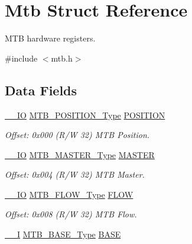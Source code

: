 \hypertarget{struct_mtb}{}\section{Mtb Struct Reference}
\label{struct_mtb}


M\+TB hardware registers.  




{\ttfamily \#include $<$mtb.\+h$>$}

\subsection*{Data Fields}
\begin{DoxyCompactItemize}
\item 
\mbox{\hyperlink{core__cm0plus_8h_aec43007d9998a0a0e01faede4133d6be}{\+\_\+\+\_\+\+IO}} \mbox{\hyperlink{union_m_t_b___p_o_s_i_t_i_o_n___type}{M\+T\+B\+\_\+\+P\+O\+S\+I\+T\+I\+O\+N\+\_\+\+Type}} \mbox{\hyperlink{struct_mtb_a7d1d53cd1d4146a97fb88e68e21de82f}{P\+O\+S\+I\+T\+I\+ON}}
\begin{DoxyCompactList}\small\item\em Offset\+: 0x000 (R/W 32) M\+TB Position. \end{DoxyCompactList}\item 
\mbox{\hyperlink{core__cm0plus_8h_aec43007d9998a0a0e01faede4133d6be}{\+\_\+\+\_\+\+IO}} \mbox{\hyperlink{union_m_t_b___m_a_s_t_e_r___type}{M\+T\+B\+\_\+\+M\+A\+S\+T\+E\+R\+\_\+\+Type}} \mbox{\hyperlink{struct_mtb_ae46de36e16f88cf202a77610219287f3}{M\+A\+S\+T\+ER}}
\begin{DoxyCompactList}\small\item\em Offset\+: 0x004 (R/W 32) M\+TB Master. \end{DoxyCompactList}\item 
\mbox{\hyperlink{core__cm0plus_8h_aec43007d9998a0a0e01faede4133d6be}{\+\_\+\+\_\+\+IO}} \mbox{\hyperlink{union_m_t_b___f_l_o_w___type}{M\+T\+B\+\_\+\+F\+L\+O\+W\+\_\+\+Type}} \mbox{\hyperlink{struct_mtb_a3321b65b1f61270bfa17be24d2770d69}{F\+L\+OW}}
\begin{DoxyCompactList}\small\item\em Offset\+: 0x008 (R/W 32) M\+TB Flow. \end{DoxyCompactList}\item 
\mbox{\hyperlink{core__cm0plus_8h_af63697ed9952cc71e1225efe205f6cd3}{\+\_\+\+\_\+I}} \mbox{\hyperlink{union_m_t_b___b_a_s_e___type}{M\+T\+B\+\_\+\+B\+A\+S\+E\+\_\+\+Type}} \mbox{\hyperlink{struct_mtb_a5181cd5228fec76207863470746aee70}{B\+A\+SE}}

\end{DoxyCompactItemize}
